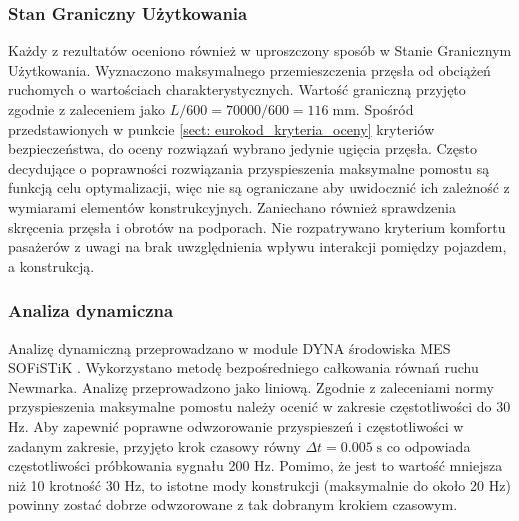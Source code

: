\subsubsection{Stan Graniczny Użytkowania}
Każdy z rezultatów oceniono również w uproszczony sposób w Stanie Granicznym Użytkowania. Wyznaczono maksymalnego przemieszczenia przęsła od obciążeń ruchomych o wartościach charakterystycznych. Wartość graniczną przyjęto zgodnie z zaleceniem \cite{PKNc} jako $L/600=70000/600=116\;\text{mm}$. Spośród przedstawionych w punkcie \ref{sect: eurokod_kryteria_oceny} kryteriów bezpieczeństwa, do oceny rozwiązań wybrano jedynie ugięcia przęsła. Często decydujące o poprawności rozwiązania przyspieszenia maksymalne pomostu są funkcją celu optymalizacji, więc nie są ograniczane aby uwidocznić ich zależność z wymiarami elementów konstrukcyjnych. Zaniechano również sprawdzenia skręcenia przęsła i obrotów na podporach. Nie rozpatrywano kryterium komfortu pasażerów z uwagi na brak uwzględnienia wpływu interakcji pomiędzy pojazdem, a konstrukcją.

\subsubsection{Analiza dynamiczna}
Analizę dynamiczną przeprowadzano w module DYNA środowiska MES SOFiSTiK \cite{SOFISTIK2018a}. Wykorzystano metodę bezpośredniego całkowania równań ruchu Newmarka. Analizę przeprowadzono jako liniową. Zgodnie z zaleceniami normy \cite{PKNc} przyspieszenia maksymalne pomostu należy ocenić w zakresie częstotliwości do 30 Hz. Aby zapewnić poprawne odwzorowanie przyspieszeń i częstotliwości w zadanym zakresie, przyjęto krok czasowy równy $\Delta t = 0.005\;\text{s}$ co odpowiada częstotliwości próbkowania sygnału 200 Hz. Pomimo, że jest to wartość mniejsza niż 10 krotność 30 Hz, to istotne mody konstrukcji (maksymalnie do około 20 Hz) powinny zostać dobrze odwzorowane z tak dobranym krokiem czasowym.

